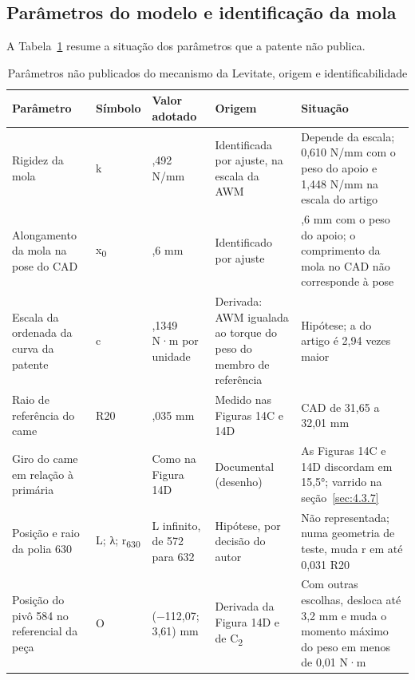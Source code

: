 \subsection{Parâmetros do modelo e identificação da mola}\label{sec:4.3.4}

A Tabela~\ref{tab:parametros-nao-publicados-mecanismo} resume a situação dos parâmetros que a patente não publica.

\begin{table}[!htbp]
\estilotabela{\small}
\caption{Parâmetros não publicados do mecanismo da Levitate, origem e identificabilidade}\label{tab:parametros-nao-publicados-mecanismo}
\begin{tabularx}{\textwidth}{@{}>{\hsize=1.229\hsize\raggedright\arraybackslash}X>{\hsize=0.566\hsize\centering\arraybackslash}X>{\hsize=0.801\hsize\centering\arraybackslash}X>{\hsize=1.068\hsize\raggedright\arraybackslash}X>{\hsize=1.335\hsize\raggedright\arraybackslash}X@{}}
\toprule
\centering\textbf{Parâmetro} & \centering\textbf{Símbolo} & \centering\textbf{Valor adotado} & \centering\textbf{Origem} & \centering\textbf{Situação} \tabularnewline
\midrule
Rigidez da mola & k & 0,492 N/mm & Identificada por ajuste, na escala da AWM & Depende da escala; 0,610 N/mm com o peso do apoio e 1,448 N/mm na escala do artigo \\
Alongamento da mola na pose do CAD & x\textsubscript{0} & 323,6 mm & Identificado por ajuste & 293,6 mm com o peso do apoio; o comprimento da mola no CAD não corresponde à pose \\
Escala da ordenada da curva da patente & c & 0,1349 N·m por unidade & Derivada: AWM igualada ao torque do peso do membro de referência & Hipótese; a do artigo \cite{okabe2026} é 2,94 vezes maior \\
Raio de referência do came & R20 & 32,035 mm & Medido nas Figuras 14C e 14D & CAD de 31,65 a 32,01 mm \\
Giro do came em relação à primária &  & Como na Figura 14D & Documental (desenho) & As Figuras 14C e 14D discordam em 15,5°; varrido na seção~\ref{sec:4.3.7} \\
Posição e raio da polia 630 & L; λ; r\textsubscript{630} & L infinito, de 572 para 632 & Hipótese, por decisão do autor & Não representada; numa geometria de teste, muda r em até 0,031 R20 \\
Posição do pivô 584 no referencial da peça & O & (−112,07; 3,61) mm & Derivada da Figura 14D e de C\textsubscript{2} & Com outras escolhas, desloca até 3,2 mm e muda o momento máximo do peso em menos de 0,01 N·m \\
\bottomrule
\end{tabularx}
\end{table}

